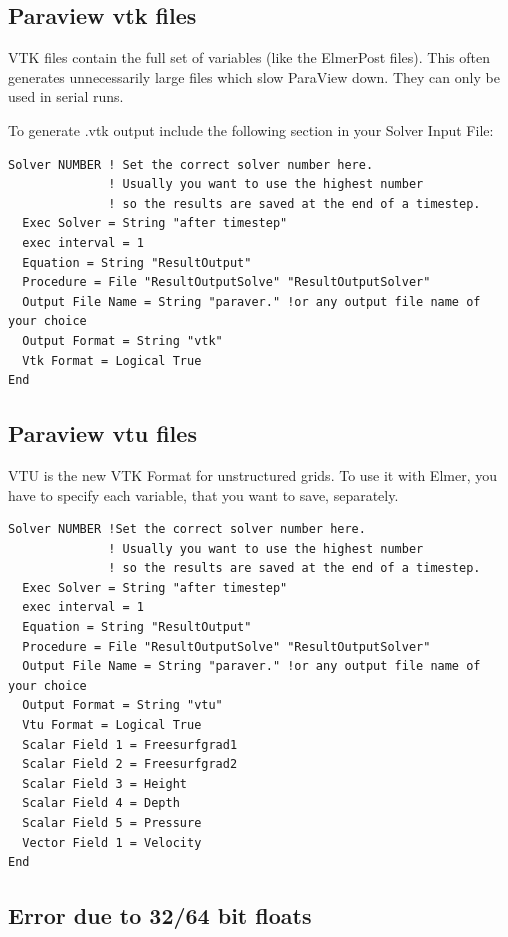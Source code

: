 \subsection{Paraview vtk files}

VTK files contain the full set of variables (like the ElmerPost files). This often generates unnecessarily large files which slow ParaView down. They can only be used in serial runs.

To generate .vtk output include the following section in your Solver Input File:

\begin{verbatim}
Solver NUMBER ! Set the correct solver number here.
              ! Usually you want to use the highest number
              ! so the results are saved at the end of a timestep.
  Exec Solver = String "after timestep"	
  exec interval = 1
  Equation = String "ResultOutput"
  Procedure = File "ResultOutputSolve" "ResultOutputSolver"
  Output File Name = String "paraver." !or any output file name of your choice
  Output Format = String "vtk"
  Vtk Format = Logical True
End
\end{verbatim}


\subsection{Paraview vtu files}

VTU is the new VTK Format for unstructured grids. To use it with Elmer, you have to specify each variable, that you want to save, separately.

\begin{verbatim}
Solver NUMBER !Set the correct solver number here.
              ! Usually you want to use the highest number 
              ! so the results are saved at the end of a timestep.
  Exec Solver = String "after timestep"	
  exec interval = 1
  Equation = String "ResultOutput"
  Procedure = File "ResultOutputSolve" "ResultOutputSolver"
  Output File Name = String "paraver." !or any output file name of your choice
  Output Format = String "vtu"
  Vtu Format = Logical True
  Scalar Field 1 = Freesurfgrad1
  Scalar Field 2 = Freesurfgrad2
  Scalar Field 3 = Height
  Scalar Field 4 = Depth
  Scalar Field 5 = Pressure
  Vector Field 1 = Velocity
End
\end{verbatim}

\subsection{Error due to 32/64 bit floats}


